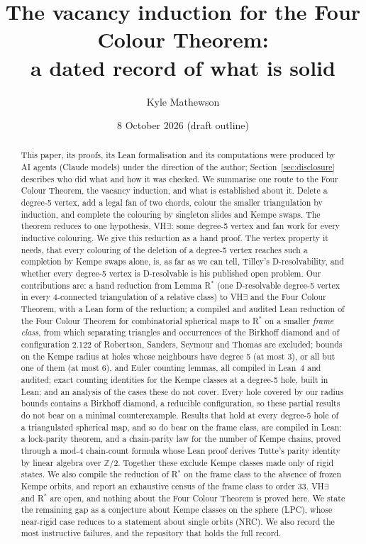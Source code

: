 \documentclass[11pt]{article}
\title{The vacancy induction for the Four Colour Theorem:\\ a dated record of what is solid}
\author{Kyle Mathewson}
\date{8 October 2026 (draft outline)}
\begin{document}
\maketitle
\begin{abstract}This paper, its proofs, its Lean formalisation and its computations were produced by AI agents (Claude models) under the direction of the author; Section~\ref{sec:disclosure} describes who did what and how it was checked. %
We summarise one route to the Four Colour Theorem, the vacancy induction, and what is established about it. Delete a degree-5 vertex, add a legal fan of two chords, colour the smaller triangulation by induction, and complete the colouring by singleton slides and Kempe swaps. The theorem reduces to one hypothesis, VH$\exists$: some degree-5 vertex and fan work for every inductive colouring. We give this reduction as a hand proof. The vertex property it needs, that every colouring of the deletion of a degree-5 vertex reaches such a completion by Kempe swaps alone, is, as far as we can tell, Tilley's D-resolvability, and whether every degree-5 vertex is D-resolvable is his published open problem. Our contributions are: a hand reduction from Lemma R$^\ast$ (one D-resolvable degree-5 vertex in every 4-connected triangulation of a relative class) to VH$\exists$ and the Four Colour Theorem, with a Lean form of the reduction; a compiled and audited Lean reduction of the Four Colour Theorem for combinatorial spherical maps to R$^\ast$ on a smaller \emph{frame class}, from which separating triangles and occurrences of the Birkhoff diamond and of configuration 2.122 of Robertson, Sanders, Seymour and Thomas are excluded; bounds on the Kempe radius at holes whose neighbours have degree 5 (at most 3), or all but one of them (at most 6), and Euler counting lemmas, all compiled in Lean~4 and audited; exact counting identities for the Kempe classes at a degree-5 hole, built in Lean; and an analysis of the cases these do not cover. Every hole covered by our radius bounds contains a Birkhoff diamond, a reducible configuration, so these partial results do not bear on a minimal counterexample. Results that hold at every degree-5 hole of a triangulated spherical map, and so do bear on the frame class, are compiled in Lean: a lock-parity theorem, and a chain-parity law for the number of Kempe chains, proved through a mod-4 chain-count formula whose Lean proof derives Tutte's parity identity by linear algebra over $\mathbb Z/2$. Together these exclude Kempe classes made only of rigid states. We also compile the reduction of R$^\ast$ on the frame class to the absence of frozen Kempe orbits, and report an exhaustive census of the frame class to order 33. VH$\exists$ and R$^\ast$ are open, and nothing about the Four Colour Theorem is proved here. We state the remaining gap as a conjecture about Kempe classes on the sphere (LPC), whose near-rigid case reduces to a statement about single orbits (NRC). We also record the most instructive failures, and the repository that holds the full record.\end{abstract}
\end{document}
